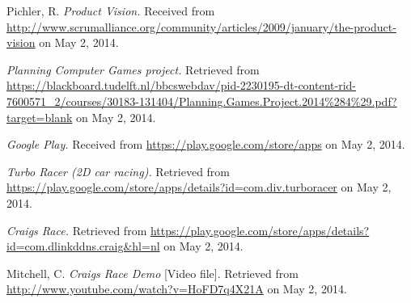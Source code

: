 \documentclass[11pt,twoside,a4paper]{article}
\begin{document}
\clearpage
\begin{thebibliography}{10}

Pichler, R. \textit{Product Vision.} Received from \url{http://www.scrumalliance.org/community/articles/2009/january/the-product-vision} on May 2, 2014.

\textit{Planning Computer Games project.} Retrieved from \url{https://blackboard.tudelft.nl/bbcswebdav/pid-2230195-dt-content-rid-7600571_2/courses/30183-131404/Planning.Games.Project.2014%284%29.pdf?target=blank} on May 2, 2014.

\textit{Google Play.} Received from \url{https://play.google.com/store/apps} on May 2, 2014.

\textit{Turbo Racer (2D car racing).} Retrieved from \url{https://play.google.com/store/apps/details?id=com.div.turboracer} on May 2, 2014.

\textit{Craigs Race.} Retrieved from \url{https://play.google.com/store/apps/details?id=com.dlinkddns.craig&hl=nl} on May 2, 2014.

Mitchell, C. \textit{Craigs Race Demo} [Video file]. Retrieved from \url{http://www.youtube.com/watch?v=HoFD7q4X21A} on May 2, 2014.

\end{thebibliography}
\end{document}

